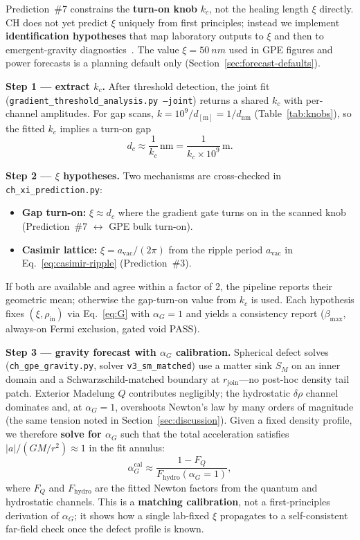 \documentclass[11pt,a4paper]{article}
\begin{document}
Prediction~\#7 constrains the \textbf{turn-on knob} $k_c$, not the healing length $\xi$ directly.
CH does not yet predict $\xi$ uniquely from first principles; instead we implement \textbf{identification hypotheses} that map laboratory outputs to $\xi$ and then to emergent-gravity diagnostics~\cite{CHSpaceFabric2026}.
The value $\xi = \SI{50}{nm}$ used in GPE figures and power forecasts is a planning default only (Section~\ref{sec:forecast-defaults}).

\textbf{Step 1 --- extract $k_c$.}
After threshold detection, the joint fit (\texttt{gradient\_threshold\_analysis.py --joint}) returns a shared $k_c$ with per-channel amplitudes.
For gap scans, $k = 10^9/d_{[\mathrm{m}]} = 1/d_{\mathrm{nm}}$ (Table~\ref{tab:knobs}), so the fitted $k_c$ implies a turn-on gap
\begin{equation}
  d_c \approx \frac{1}{k_c}\,\mathrm{nm} = \frac{1}{k_c \times 10^9}\,\mathrm{m}.
  \label{eq:dc-from-kc}
\end{equation}

\textbf{Step 2 --- $\xi$ hypotheses.}
Two mechanisms are cross-checked in \texttt{ch\_xi\_prediction.py}:
\begin{itemize}[leftmargin=*]
  \item \textbf{Gap turn-on:} $\xi \approx d_c$ where the gradient gate turns on in the scanned knob (Prediction~\#7 $\leftrightarrow$ GPE bulk turn-on).
  \item \textbf{Casimir lattice:} $\xi = a_{\mathrm{vac}}/(2\pi)$ from the ripple period $a_{\mathrm{vac}}$ in Eq.~\ref{eq:casimir-ripple} (Prediction~\#3).
\end{itemize}
If both are available and agree within a factor of 2, the pipeline reports their geometric mean; otherwise the gap-turn-on value from $k_c$ is used.
Each hypothesis fixes $(\xi, \rho_{\mathrm{in}})$ via Eq.~\ref{eq:G} with $\alpha_G = 1$ and yields a consistency report ($\beta_{\max}$, always-on Fermi exclusion, gated void PASS).

\textbf{Step 3 --- gravity forecast with $\alpha_G$ calibration.}
Spherical defect solves (\texttt{ch\_gpe\_gravity.py}, solver \texttt{v3\_sm\_matched}) use a matter sink $S_M$ on an inner domain and a Schwarzschild-matched boundary at $r_{\mathrm{join}}$---no post-hoc density tail patch.
Exterior Madelung $Q$ contributes negligibly; the hydrostatic $\delta\rho$ channel dominates and, at $\alpha_G = 1$, overshoots Newton's law by many orders of magnitude (the same tension noted in Section~\ref{sec:discussion}).
Given a fixed density profile, we therefore \textbf{solve for $\alpha_G$} such that the total acceleration satisfies $|a|/(GM/r^2) \approx 1$ in the fit annulus:
\begin{equation}
  \alpha_G^{\mathrm{cal}} \approx \frac{1 - F_Q}{F_{\mathrm{hydro}}(\alpha_G=1)},
  \label{eq:alpha-cal}
\end{equation}
where $F_Q$ and $F_{\mathrm{hydro}}$ are the fitted Newton factors from the quantum and hydrostatic channels.
This is a \textbf{matching calibration}, not a first-principles derivation of $\alpha_G$; it shows how a single lab-fixed $\xi$ propagates to a self-consistent far-field check once the defect profile is known.
\end{document}
